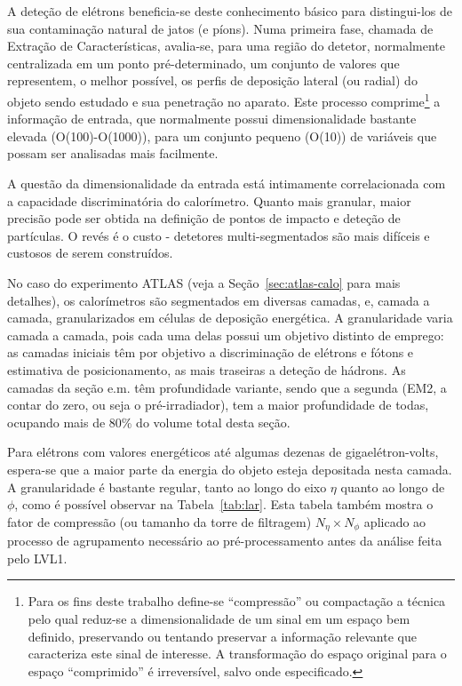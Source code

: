 
A deteção de elétrons beneficia-se deste conhecimento básico para
distingui-los de sua contaminação natural de jatos (e píons). Numa primeira
fase, chamada de Extração de Características, avalia-se, para uma região do
detetor, normalmente centralizada em um ponto pré-determinado, um conjunto de
valores que representem, o melhor possível, os perfis de deposição lateral (ou
radial) do objeto sendo estudado e sua penetração no aparato. Este processo
comprime\footnote{Para os fins deste trabalho define-se ``compressão'' ou
compactação a técnica pelo qual reduz-se a dimensionalidade de um sinal em um
espaço bem definido, preservando ou tentando preservar a informação relevante
que caracteriza este sinal de interesse. A transformação do espaço original
para o espaço ``comprimido'' é irreversível, salvo onde especificado.} a
informação de entrada, que normalmente possui dimensionalidade bastante
elevada (O(100)-O(1000)), para um conjunto pequeno (O(10)) de variáveis que
possam ser analisadas mais facilmente.

A questão da dimensionalidade da entrada está intimamente correlacionada com a
capacidade discriminatória do calorímetro. Quanto mais granular, maior
precisão pode ser obtida na definição de pontos de impacto e deteção de
partículas. O revés é o custo - detetores multi-segmentados são mais difíceis
e custosos de serem construídos.

No caso do experimento ATLAS (veja a Seção~\ref{sec:atlas-calo} para mais
detalhes), os calorímetros são segmentados em diversas camadas, e, camada a
camada, granularizados em células de deposição energética. A granularidade
varia camada a camada, pois cada uma delas possui um objetivo distinto de
emprego: as camadas iniciais têm por objetivo a discriminação de elétrons e
fótons e estimativa de posicionamento, as mais traseiras a deteção de
hádrons. As camadas da seção e.m. têm profundidade variante, sendo que a
segunda (EM2, a contar do zero, ou seja o pré-irradiador), tem a maior
profundidade de todas, ocupando mais de 80\% do volume total desta seção.

Para elétrons com valores energéticos até algumas dezenas de
gigaelétron-volts, espera-se que a maior parte da energia do objeto esteja
depositada nesta camada. A granularidade é bastante regular, tanto ao longo do
eixo $\eta$ quanto ao longo de $\phi$, como é possível observar na
Tabela~\ref{tab:lar}. Esta tabela também mostra o fator de compressão (ou
tamanho da torre de filtragem) $N_{\eta} \times N_{\phi}$ aplicado ao processo
de agrupamento necessário ao pré-processamento antes da análise feita pelo
LVL1.

